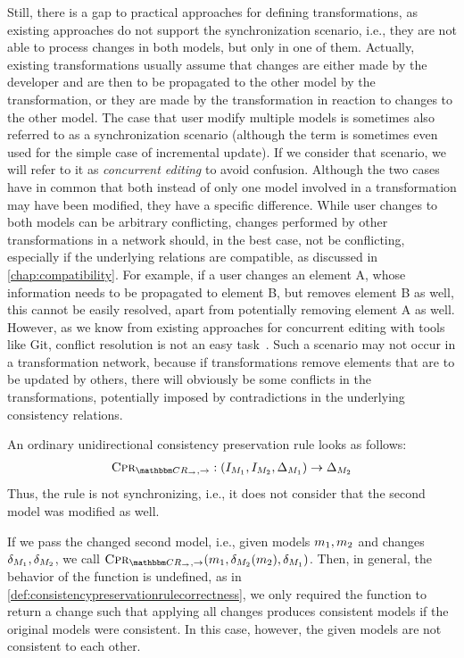 Still, there is a gap to practical approaches for defining transformations, as existing approaches do not support the synchronization scenario, i.e., they are not able to process changes in both models, but only in one of them.
Actually, existing transformations usually assume that changes are either made by the developer and are then to be propagated to the other model by the transformation, or they are made by the transformation in reaction to changes to the other model.
The case that user modify multiple models is sometimes also referred to as a synchronization scenario (although the term is sometimes even used for the simple case of incremental update).
If we consider that scenario, we will refer to it as \emph{concurrent editing} to avoid confusion.
Although the two cases have in common that both instead of only one model involved in a transformation may have been modified, they have a specific difference.
While user changes to both models can be arbitrary conflicting, changes performed by other transformations in a network should, in the best case, not be conflicting, especially if the underlying relations are compatible, as discussed in \autoref{chap:compatibility}.
For example, if a user changes an element A, whose information needs to be propagated to element B, but removes element B as well, this cannot be easily resolved, apart from potentially removing element A as well.
However, as we know from existing approaches for concurrent editing with tools like Git, conflict resolution is not an easy task~.
Such a scenario may not occur in a transformation network, because if transformations remove elements that are to be updated by others, there will obviously be some conflicts in the transformations, potentially imposed by contradictions in the underlying consistency relations.

An ordinary unidirectional consistency preservation rule looks as follows:
\begin{align*}
    \consistencypreservationrule{\consistencyrelationset{CR}_{\rightarrow},\rightarrow} : (\metamodelinstanceset{M}{1}, \metamodelinstanceset{M}{2}, \changeuniverse{\metamodel{M}{1}}) \rightarrow \changeuniverse{\metamodel{M}{2}}
\end{align*}
Thus, the rule is not synchronizing, i.e., it does not consider that the second model was modified as well.

If we pass the changed second model, i.e., given models $m_{1},m_{2}$ and changes $\delta_{M_{1}},\delta_{M_{2}}$, we call $\consistencypreservationrule{\consistencyrelationset{CR}_{\rightarrow},\rightarrow}(\model{m}{1},\change{\metamodel{M}{2}}(\model{m}{2}),\change{\metamodel{M}{1}})$.
Then, in general, the behavior of the function is undefined, as in \autoref{def:consistencypreservationrulecorrectness}, we only required the function to return a change such that applying all changes produces consistent models if the original models were consistent.
In this case, however, the given models are not consistent to each other.

